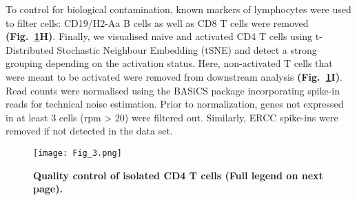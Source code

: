 To control for biological contamination, known markers of lymphocytes were used to filter cells: CD19\plus{}/H2-Aa\plus{} B cells as well as CD8\plus{} T cells were removed \textbf{(Fig.~\ref{fig1:QC}H)}. Finally, we visualised naive and activated CD4\plus{} T cells using t-Distributed Stochastic Neighbour Embedding (tSNE) and detect a strong grouping depending on the activation status. Here, non-activated T cells that were meant to be activated were removed from downstream analysis \textbf{(Fig.~\ref{fig1:QC}I)}. Read counts were normalised using the BASiCS package \citep{Vallejos2015} incorporating spike-in reads for technical noise estimation. Prior to normalization, genes not expressed in at least 3 cells (rpm > 20) were filtered out. Similarly, ERCC spike-ins were removed if not detected in the data set.

\newpage

\begin{figure}[!hb]
\centering
\texttt{[image: Fig\_3.png]}
\caption[Quality control of isolated CD4\plus{} T cells]{\textbf{Quality control of isolated CD4\plus{} T cells (Full legend on next page).}\\}
\label{fig1:QC}
\end{figure}

\newpage

